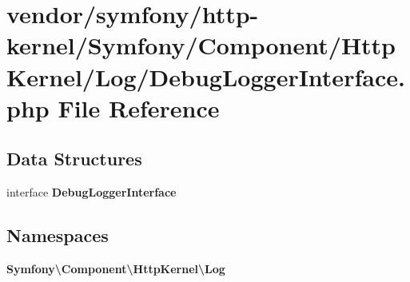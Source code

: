 \section{vendor/symfony/http-\/kernel/\+Symfony/\+Component/\+Http\+Kernel/\+Log/\+Debug\+Logger\+Interface.php File Reference}
\label{_debug_logger_interface_8php}
\subsection*{Data Structures}
\begin{DoxyCompactItemize}
\item 
interface {\bf Debug\+Logger\+Interface}
\end{DoxyCompactItemize}
\subsection*{Namespaces}
\begin{DoxyCompactItemize}
\item 
 {\bf Symfony\textbackslash{}\+Component\textbackslash{}\+Http\+Kernel\textbackslash{}\+Log}
\end{DoxyCompactItemize}
